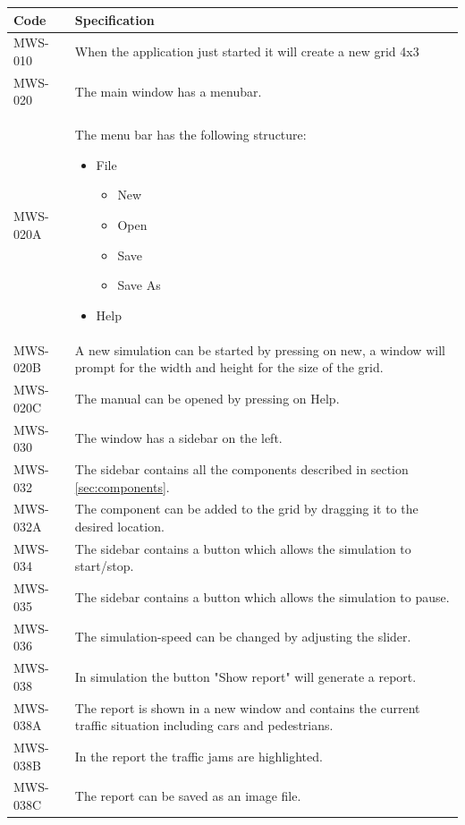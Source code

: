 \begin{tabularx}{\textwidth}{|p{2cm}X|}\hline
	Code & Specification \\\hline
	MWS-010 & When the application just started it will create a new grid 4x3\\\hline
	MWS-020 & The main window has a menubar.\\\hline
	MWS-020A & The menu bar has the following structure:
	\begin{itemize}[noitemsep,nolistsep]
		\item File
		\begin{itemize}
			\item New
			\item Open
			\item Save
			\item Save As
		\end{itemize}
		\item Help
	\end{itemize}\\\hline
	MWS-020B & A new simulation can be started by pressing on new, a window will prompt for the width and height for the size of the grid.\\\hline
	MWS-020C & The manual can be opened by pressing on Help.\\\hline
	MWS-030 & The window has a sidebar on the left.\\\hline
	MWS-032 & The sidebar contains all the components described in section \ref*{sec:components}.\\\hline
	MWS-032A & The component can be added to the grid by dragging it to the desired location.\\\hline
	MWS-034 & The sidebar contains a button which allows the simulation to start/stop.\\\hline
	MWS-035 & The sidebar contains a button which allows the simulation to pause.\\\hline
	MWS-036 & The simulation-speed can be changed by adjusting the slider.\\\hline
	MWS-038 & In simulation the button "Show report" will generate a report.\\\hline
	MWS-038A & The report is shown in a new window and contains the current traffic situation including cars and pedestrians.\\\hline
	MWS-038B & In the report the traffic jams are highlighted.\\\hline
	MWS-038C & The report can be saved as an image file.\\\hline
\end{tabularx}

